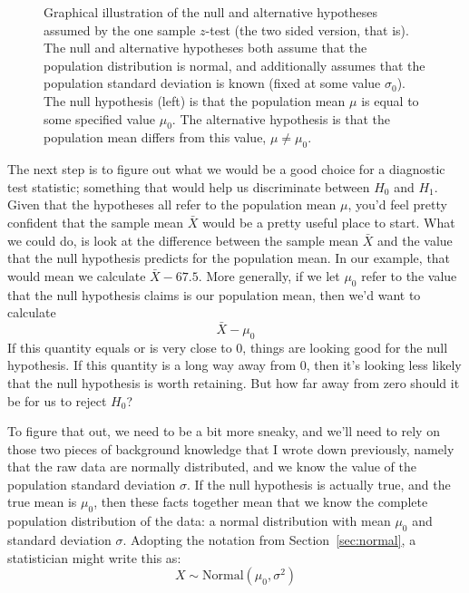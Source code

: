 \begin{figure}
\begin{center}
\caption{Graphical illustration of the null and alternative hypotheses assumed by the one sample $z$-test (the two sided version, that is). The null and alternative hypotheses both assume that the population distribution is normal, and additionally assumes that the population standard deviation is known (fixed at some value $\sigma_0$). The null hypothesis (left) is that the population mean $\mu$ is equal to some specified value $\mu_0$. The alternative hypothesis is that the population mean differs from this value, $\mu \neq \mu_0$.}
\HR
\label{fig:ztesthyp}
\end{center}
\end{figure}




The next step is to figure out what we would be a good choice for a diagnostic test statistic; something that would help us discriminate between $H_0$ and $H_1$. Given that the hypotheses all refer to the population mean $\mu$, you'd feel pretty confident that the sample mean $\bar{X}$ would be a pretty useful place to start. What we could do, is look at the difference between the sample mean $\bar{X}$ and the value that the null hypothesis predicts for the population mean. In our example, that would mean we calculate $\bar{X} - 67.5$. More generally, if we let $\mu_0$ refer to the value that the null hypothesis claims is our population mean, then we'd want to calculate
$$
\bar{X} - \mu_0
$$
If this quantity equals or is very close to 0, things are looking good for the null hypothesis. If this quantity is a long way away from 0, then it's looking less likely that the null hypothesis is worth retaining. But how far away from zero should it be for us to reject $H_0$? 

To figure that out, we need to be a bit more sneaky, and we'll need to rely on those two pieces of background knowledge that I wrote down previously, namely that the raw data are normally distributed, and we know the value of the population standard deviation $\sigma$. If the null hypothesis is actually true, and the true mean is $\mu_0$, then these facts together mean that we know the complete population distribution of the data: a normal distribution with mean $\mu_0$ and standard deviation $\sigma$. Adopting the notation from Section~\ref{sec:normal}, a statistician might write this as:
$$
X \sim \mbox{Normal}(\mu_0,\sigma^2)
$$


